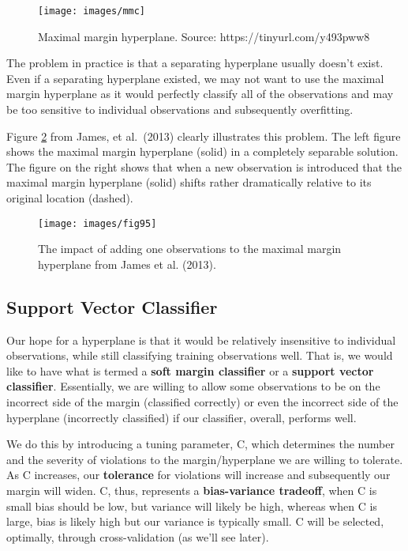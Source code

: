 \documentclass[
]{book}
\begin{document}
\begin{figure}
\texttt{[image: images/mmc]} \caption{Maximal margin hyperplane. Source: https://tinyurl.com/y493pww8}\label{fig:mmc}
\end{figure}

The problem in practice is that a separating hyperplane usually doesn't exist. Even if a separating hyperplane existed, we may not want to use the maximal margin hyperplane as it would perfectly classify all of the observations and may be too sensitive to individual observations and subsequently overfitting.

Figure \ref{fig:fig95} from James, et al.~(2013) clearly illustrates this problem. The left figure shows the maximal margin hyperplane (solid) in a completely separable solution. The figure on the right shows that when a new observation is introduced that the maximal margin hyperplane (solid) shifts rather dramatically relative to its original location (dashed).

\begin{figure}
\texttt{[image: images/fig95]} \caption{The impact of adding one observations to the maximal margin hyperplane from James et al. (2013).}\label{fig:fig95}
\end{figure}

\hypertarget{support-vector-classifier}{%
\subsection{Support Vector Classifier}\label{support-vector-classifier}}

Our hope for a hyperplane is that it would be relatively insensitive to individual observations, while still classifying training observations well. That is, we would like to have what is termed a \textbf{soft margin classifier} or a \textbf{support vector classifier}. Essentially, we are willing to allow some observations to be on the incorrect side of the margin (classified correctly) or even the incorrect side of the hyperplane (incorrectly classified) if our classifier, overall, performs well.

We do this by introducing a tuning parameter, C, which determines the number and the severity of violations to the margin/hyperplane we are willing to tolerate. As C increases, our \textbf{tolerance} for violations will increase and subsequently our margin will widen. C, thus, represents a \textbf{bias-variance tradeoff}, when C is small bias should be low, but variance will likely be high, whereas when C is large, bias is likely high but our variance is typically small. C will be selected, optimally, through cross-validation (as we'll see later).
\end{document}
